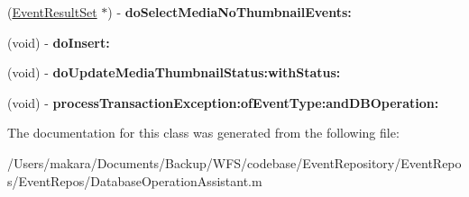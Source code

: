 \begin{DoxyCompactItemize}
\item 
\hypertarget{interface_database_operation_assistant_07private_08_a6669cdeea10980edabf2357b0af5f812}{
(\hyperlink{interface_event_result_set}{\-Event\-Result\-Set} $\ast$) -\/ {\bfseries do\-Select\-Media\-No\-Thumbnail\-Events\-:}}
\label{interface_database_operation_assistant_07private_08_a6669cdeea10980edabf2357b0af5f812}

\item 
\hypertarget{interface_database_operation_assistant_07private_08_afff8fbd3ffdd581501616338072f0ce9}{
(void) -\/ {\bfseries do\-Insert\-:}}
\label{interface_database_operation_assistant_07private_08_afff8fbd3ffdd581501616338072f0ce9}

\item 
\hypertarget{interface_database_operation_assistant_07private_08_ac6e19850d53ac7605c37ea9379f0771d}{
(void) -\/ {\bfseries do\-Update\-Media\-Thumbnail\-Status\-:with\-Status\-:}}
\label{interface_database_operation_assistant_07private_08_ac6e19850d53ac7605c37ea9379f0771d}

\item 
\hypertarget{interface_database_operation_assistant_07private_08_a95363d47cee4c46d86098283a1baa3b5}{
(void) -\/ {\bfseries process\-Transaction\-Exception\-:of\-Event\-Type\-:and\-D\-B\-Operation\-:}}
\label{interface_database_operation_assistant_07private_08_a95363d47cee4c46d86098283a1baa3b5}

\end{DoxyCompactItemize}


\-The documentation for this class was generated from the following file\-:\begin{DoxyCompactItemize}
\item 
/\-Users/makara/\-Documents/\-Backup/\-W\-F\-S/codebase/\-Event\-Repository/\-Event\-Repos/\-Event\-Repos/\-Database\-Operation\-Assistant.\-m\end{DoxyCompactItemize}
